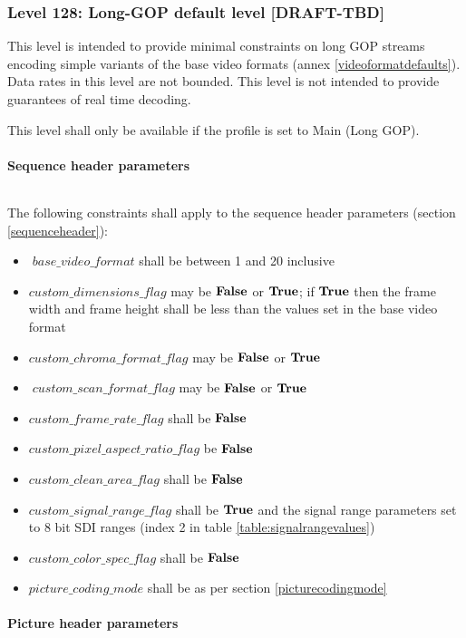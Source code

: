 \subsubsection{Level 128: Long-GOP default level [DRAFT-TBD]}

This level is intended to provide minimal constraints on long GOP
streams encoding simple variants of the base video formats 
(annex \ref{videoformatdefaults}). 
Data rates in this level are not bounded. This level is not intended to provide
guarantees of real time decoding.

This level shall only be available if the profile is set to Main (Long GOP).

\paragraph{Sequence header parameters}$\ $\newline

The following constraints shall apply to the sequence header parameters
(section \ref{sequenceheader}):
\begin{itemize}
\item$base\_video\_format$ shall be between 1 and 20 inclusive
\item $custom\_dimensions\_flag$ may be $\text{\bf{False}}$ or $\text{\bf{True}}$; if $\text{\bf{True}}$ then
the frame width and frame height shall be less than the values set in the
base video format
\item $custom\_chroma\_format\_flag$ may be $\text{\bf{False}}$ or $\text{\bf{True}}$
\item$custom\_scan\_format\_flag$ may be $\text{\bf{False}}$ or $\text{\bf{True}}$
\item $custom\_frame\_rate\_flag$ shall be $\text{\bf{False}}$
\item $custom\_pixel\_aspect\_ratio\_flag$ be $\text{\bf{False}}$
\item $custom\_clean\_area\_flag$ shall be $\text{\bf{False}}$
\item $custom\_signal\_range\_flag$ shall be $\text{\bf{True}}$ and the signal range 
parameters set to 8 bit SDI ranges (index 2 in table \ref{table:signalrangevalues})
\item $custom\_color\_spec\_flag$ shall be $\text{\bf{False}}$
\item $picture\_coding\_mode$ shall be as per section \ref{picturecodingmode}
\end{itemize}

\paragraph{Picture header parameters}$\ $\newline

